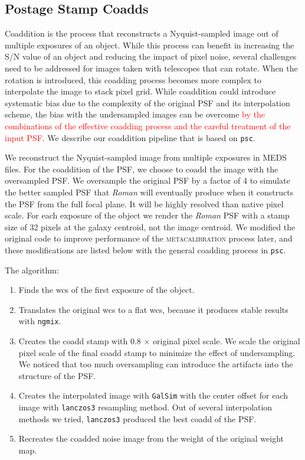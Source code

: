 {\subsection{Postage Stamp Coadds}
\label{subsec:psc}
Coaddition is the process that reconstructs a Nyquist-sampled image out of multiple exposures of an object. While this process can benefit in increasing the S/N value of an object and reducing the impact of pixel noise, several challenges need to be addressed for images taken with telescopes that can rotate. When the rotation is introduced, this coadding process becomes more complex to interpolate the image to stack pixel grid. While coaddition could introduce systematic bias due to the complexity of the original PSF and its interpolation scheme, the bias with the undersampled images can be overcome \textcolor{red}{by the combinations of the effective coadding process and the careful treatment of the input PSF}. We describe our coaddition pipeline that is based on \texttt{psc}.


We reconstruct the Nyquist-sampled image from multiple exposures in MEDS files. For the coaddition of the PSF, we choose to coadd the image with the oversampled PSF. We oversample the original PSF by a factor of 4 to simulate the better sampled PSF that \emph{Roman} will eventually produce when it constructs the PSF from the full focal plane. It will be highly resolved than native pixel scale. For each exposure of the object we render the \emph{Roman} PSF with a stamp size of 32 pixels at the galaxy centroid, not the image centroid. We modified the original code to improve performance of the \textsc{metacalibration} process later, and these modifications are listed below with the general coadding process in \texttt{psc}. 

The algorithm: 
\begin{enumerate}
    \setlength\itemsep{1em}
    \item Finds the wcs of the first exposure of the object.
    \item Translates the original wcs to a flat wcs, because it produces stable results with \texttt{ngmix}.
    \item Creates the coadd stamp with 0.8 $\times$ original pixel scale. We scale the original pixel scale of the final coadd stamp to minimize the effect of undersampling. We noticed that too much oversampling can introduce the artifacts into the structure of the PSF. 
    \item Creates the interpolated image with \texttt{GalSim} with the center offset for each image with \texttt{lanczos3} resampling method. Out of several interpolation methods we tried, \texttt{lanczos3} produced the best coadd of the PSF.
    \item Recreates the coadded noise image from the weight of the original weight map.
\end{enumerate}


}
